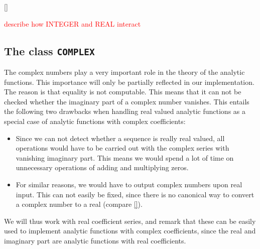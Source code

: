 \documentclass{article}
\newcommand{\ir}[1]{\texttt{#1}}
\newcommand{\temp}[1]{\textcolor{red}{#1}}
\begin{document}
\ref{}

\temp{describe how INTEGER and REAL interact}

\subsection{The class \ir{COMPLEX}}\label{sec: The class COMPLEX}

The complex numbers play a very important role in the theory of the analytic functions. This importance will only be partially reflected in our implementation. The reason is that equality is not computable. This means that it can not be checked whether the imaginary part of a complex number vanishes. This entails the following two drawbacks when handling real valued analytic functions as a special case of analytic functions with complex coefficients:
\begin{itemize}
\item Since we can not detect whether a sequence is really real valued, all operations would have to be carried out with the complex series with vanishing imaginary part. This means we would spend a lot of time on unnecessary operations of adding and multiplying zeros.
\item For similar reasons, we would have to output complex numbers upon real input. This can not easily be fixed, since there is no canonical way to convert a complex number to a real (compare \cref{}).
\end{itemize}
We will thus work with real coefficient series, and remark that these can be easily used to implement analytic functions with complex coefficients, since the real and imaginary part are analytic functions with real coefficients.
\end{document}
